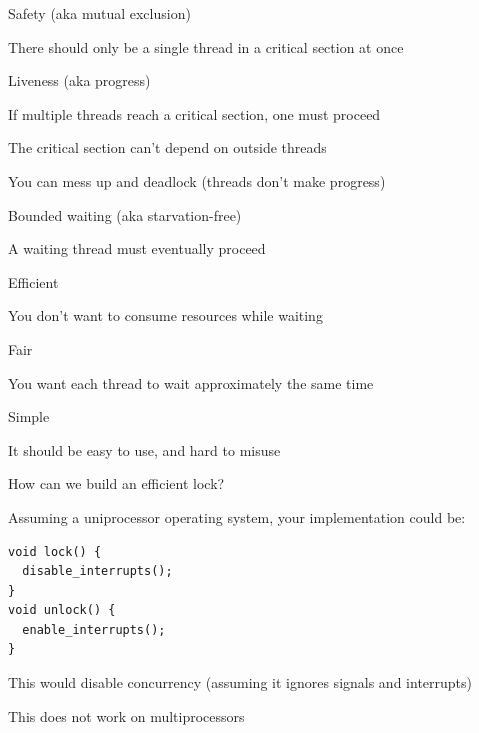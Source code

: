   \begin{slide}


    Safety (aka mutual exclusion)

    \leftspace{}There should only be a single thread in a critical section at
    once
    \medskip

    Liveness (aka progress)

    \leftspace{}If multiple threads reach a critical section, one must proceed

    \leftspace{}The critical section can't depend on outside threads

    \leftspace{}\leftspace{}You can mess up and deadlock (threads don't make progress)
    \medskip

    Bounded waiting (aka starvation-free)

    \leftspace{}A waiting thread must eventually proceed

  \end{slide}

  \begin{slide}


    Efficient

    \leftspace{}You don't want to consume resources while waiting
    \medskip

    Fair

    \leftspace{}You want each thread to wait approximately the same time
    \medskip

    Simple

    \leftspace{}It should be easy to use, and hard to misuse

  \end{slide}

	\begin{slide}
	
		
		How can we build an efficient lock?
		
	\end{slide}
	
  \begin{slide}


    Assuming a uniprocessor operating system, your implementation could be:
    \medskip

    \begin{verbatim}
void lock() {
  disable_interrupts();
}
void unlock() {
  enable_interrupts();
}   
    \end{verbatim}
    \medskip

    This would disable concurrency (assuming it ignores signals and interrupts)

    \leftspace{}This does not work on multiprocessors

  \end{slide}

